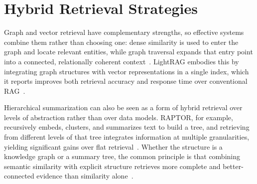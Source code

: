 \section{Hybrid Retrieval Strategies}
\label{sec:gr-hybrid}

Graph and vector retrieval have complementary strengths, so effective systems
combine them rather than choosing one: dense similarity is used to enter the graph
and locate relevant entities, while graph traversal expands that entry point into
a connected, relationally coherent context~\cite{peng2024graphrag}. LightRAG
embodies this by integrating graph structures with vector representations in a
single index, which it reports improves both retrieval accuracy and response time
over conventional RAG~\cite{guo2024lightrag}.

Hierarchical summarization can also be seen as a form of hybrid retrieval over
levels of abstraction rather than over data models. RAPTOR, for example,
recursively embeds, clusters, and summarizes text to build a tree, and retrieving
from different levels of that tree integrates information at multiple granularities,
yielding significant gains over flat retrieval~\cite{sarthi2024raptor}. Whether the
structure is a knowledge graph or a summary tree, the common principle is that
combining semantic similarity with explicit structure retrieves more complete and
better-connected evidence than similarity alone~\cite{peng2024graphrag,
sarthi2024raptor}.
